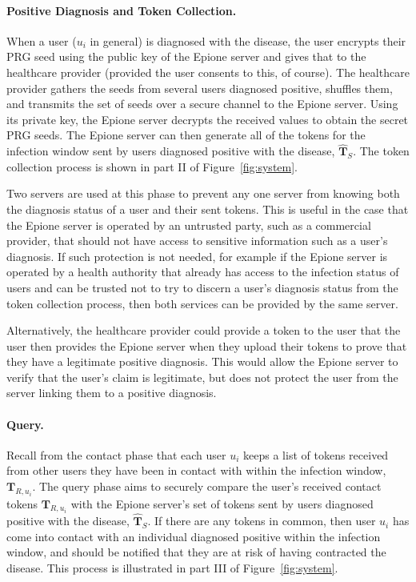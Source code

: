 \documentclass[11pt]{article} %
\newcommand{\figureref}[1]{Figure~\ref{#1}}
\newcommand{\dect}{\textsf{Epione}\xspace}
\newcommand{\sT}{\mathbf{T}}
\begin{document}
\paragraph{Positive Diagnosis and Token Collection.}

When a user ($u_i$ in general) is diagnosed with the disease, the user encrypts their PRG seed using the public key of the \dect server and gives that to the healthcare provider (provided the user consents to this, of course). The healthcare provider gathers the seeds from several users diagnosed positive, shuffles them, and transmits the set of seeds over a secure channel to the \dect server. Using its private key, the \dect server decrypts the received values to obtain the secret PRG seeds. The \dect server can then generate all of the tokens for the infection window sent by users diagnosed positive with the disease, $\widehat{\sT}_S$. The token collection process is shown in part II of \figureref{fig:system}.

Two servers are used at this phase to prevent any one server from knowing both the diagnosis status of a user and their sent tokens. This is useful in the case that the \dect server is operated by an untrusted party, such as a commercial provider, that should not have access to sensitive information such as a user's diagnosis. If such protection is not needed, for example if the \dect server is operated by a health authority that already has access to the infection status of users and can be trusted not to try to discern a user's diagnosis status from the token collection process, then both services can be provided by the same server.

Alternatively, the healthcare provider could provide a token to the user that the user then provides the \dect server when they upload their tokens to prove that they have a legitimate positive diagnosis. This would allow the \dect server to verify that the user's claim is legitimate, but does not protect the user from the server linking them to a positive diagnosis.

\paragraph{Query.}
\label{sub:pect_psi}

Recall from the contact phase that each user $u_i$ keeps a list of tokens received from other users they have been in contact with within the infection window, $\sT_{R,u_i}$. The query phase aims to securely compare the user's received contact tokens $\sT_{R,u_i}$ with the \dect server's set of tokens sent by users diagnosed positive with the disease, $\widehat{\sT}_S$. If there are any tokens in common, then user $u_i$ has come into contact with an individual diagnosed positive within the infection window, and should be notified that they are at risk of having contracted the disease. This process is illustrated in part III of \figureref{fig:system}.
\end{document}
